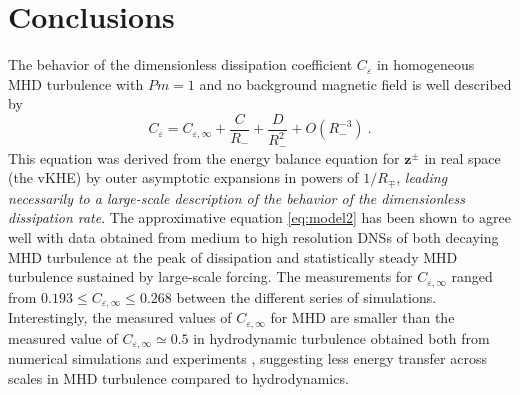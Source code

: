 \documentclass[aps,pre,onecolumn,superscriptaddress,notitlepage]{revtex4-1}
\newcommand{\Ceps}{C_\varepsilon}
\newcommand{\Cinf}{C_{\varepsilon,\infty}}
\renewcommand{\vec}[1]{\bm{#1}}
\newcommand{\beq}{\begin{equation}}
\newcommand{\eeq}{\end{equation}}
\begin{document}
\section{Conclusions}
\label{sec:conclusions}
The behavior of the dimensionless dissipation coefficient $\Ceps$ in 
homogeneous MHD turbulence with $Pm=1$ and no background magnetic field 
is well described by 
\beq
\Ceps = \Cinf + \frac{C}{R_-} + \frac{D}{R_-^2} + O(R_-^{-3}) \ .
\label{eq:model2}
\eeq
This equation was derived from the energy balance equation for $\vec{z}^\pm$ in real space (the vKHE)
by outer asymptotic expansions in powers of $1/R_{\mp}$, {\em leading necessarily to a 
large-scale description of the behavior of the dimensionless dissipation rate}. 
The approximative equation \eqref{eq:model2} has been shown to agree well with data obtained from 
medium to high resolution DNSs of both 
decaying MHD turbulence at the peak of dissipation and statistically steady MHD turbulence 
sustained by large-scale forcing. 
The measurements for $\Cinf$ ranged from $0.193 \leqslant \Cinf \leqslant 0.268$
between the different series of simulations. 
Interestingly, the measured values of $\Cinf$ for MHD are
smaller than the measured value of $\Cinf \simeq 0.5$ in hydrodynamic
turbulence obtained both from numerical simulations and experiments
\cite{Sreenivasan84,Jimenez93,Wang96,Yeung97,Sreenivasan98,Cao99,Pearson02,Kaneda03,Pearson04a,Donzis05,Bos07,Yeung12,McComb15a,Yeung15}, 
suggesting less energy transfer across scales in MHD turbulence compared to hydrodynamics. 
\end{document}
